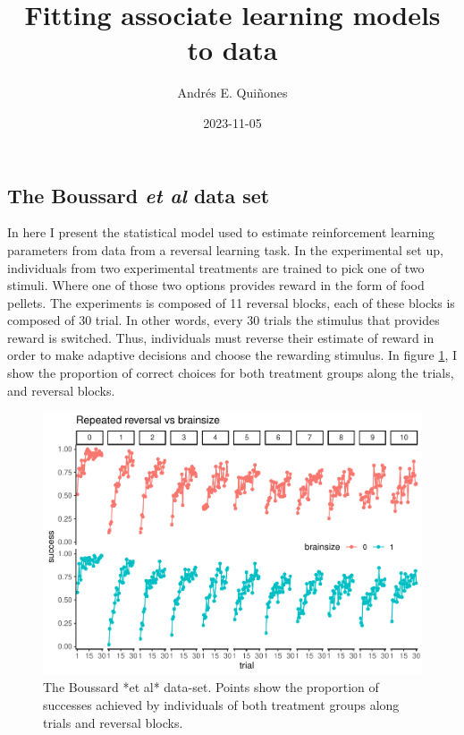 \documentclass[
]{article}
\title{Fitting associate learning models to data}
\author{Andrés E. Quiñones}
\date{2023-11-05}
\begin{document}
\maketitle

\hypertarget{the-boussard-et-al-data-set}{%
\subsection{\texorpdfstring{The Boussard \emph{et al} data
set}{The Boussard et al data set}}\label{the-boussard-et-al-data-set}}

In here I present the statistical model used to estimate reinforcement
learning parameters from data from a reversal learning task. In the
experimental set up, individuals from two experimental treatments are
trained to pick one of two stimuli. Where one of those two options
provides reward in the form of food pellets. The experiments is composed
of 11 reversal blocks, each of these blocks is composed of 30 trial. In
other words, every 30 trials the stimulus that provides reward is
switched. Thus, individuals must reverse their estimate of reward in
order to make adaptive decisions and choose the rewarding stimulus. In
figure \ref{fig:plotBoussard}, I show the proportion of correct choices
for both treatment groups along the trials, and reversal blocks.

\begin{figure}

\includegraphics{report_files/figure-latex/plotBoussard-1} \hfill{}

\caption{The Boussard *et al* data-set. Points show the proportion of successes achieved by individuals of both treatment groups along trials and reversal blocks.}\label{fig:plotBoussard}
\end{figure}
\end{document}
